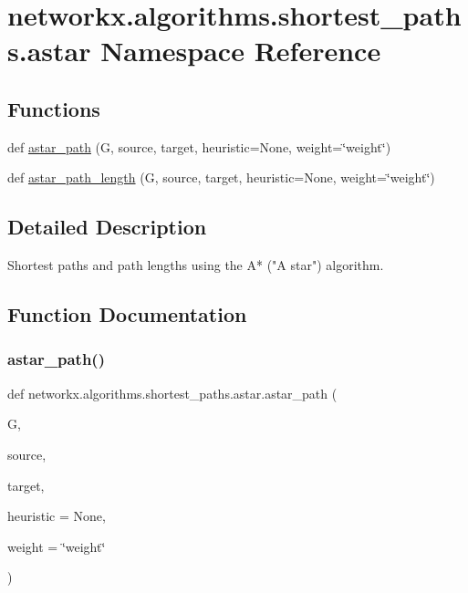 \hypertarget{namespacenetworkx_1_1algorithms_1_1shortest__paths_1_1astar}{}\section{networkx.\+algorithms.\+shortest\+\_\+paths.\+astar Namespace Reference}
\label{namespacenetworkx_1_1algorithms_1_1shortest__paths_1_1astar}
\subsection*{Functions}
\begin{DoxyCompactItemize}
\item 
def \hyperlink{namespacenetworkx_1_1algorithms_1_1shortest__paths_1_1astar_a022d31745fff4e277ddb7180af97d3fa}{astar\+\_\+path} (G, source, target, heuristic=None, weight=\char`\"{}weight\char`\"{})
\item 
def \hyperlink{namespacenetworkx_1_1algorithms_1_1shortest__paths_1_1astar_ab18470a75227f7b4fe600b156d60ab46}{astar\+\_\+path\+\_\+length} (G, source, target, heuristic=None, weight=\char`\"{}weight\char`\"{})
\end{DoxyCompactItemize}


\subsection{Detailed Description}
\begin{DoxyVerb}Shortest paths and path lengths using the A* ("A star") algorithm.
\end{DoxyVerb}
 

\subsection{Function Documentation}
\mbox{\label{namespacenetworkx_1_1algorithms_1_1shortest__paths_1_1astar_a022d31745fff4e277ddb7180af97d3fa}} 
\subsubsection{\texorpdfstring{astar\+\_\+path()}{astar\_path()}}
{\footnotesize\ttfamily def networkx.\+algorithms.\+shortest\+\_\+paths.\+astar.\+astar\+\_\+path (\begin{DoxyParamCaption}\item[{}]{G,  }\item[{}]{source,  }\item[{}]{target,  }\item[{}]{heuristic = {\ttfamily None},  }\item[{}]{weight = {\ttfamily \char`\"{}weight\char`\"{}} }\end{DoxyParamCaption})}

